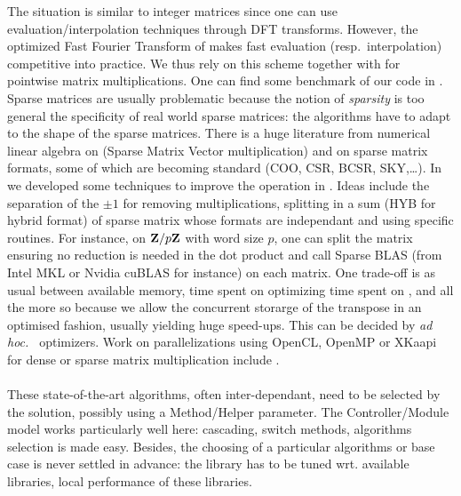%
%
The situation is similar to integer matrices since one can use
evaluation/interpolation techniques through DFT transforms. However, the
optimized Fast Fourier Transform of \cite{Harvey:2014}  makes fast evaluation
(resp.\ interpolation) competitive into practice. We thus rely on this scheme
together with \fgemm for pointwise matrix multiplications. One can find some
benchmark of our code in \cite{GioLeb14}.
%
%
Sparse matrices are usually problematic because the notion of \emph{sparsity}
is too general \vs the specificity of real world sparse matrices: the
algorithms have to adapt to the shape of the sparse matrices.
%
There is a huge literature from numerical linear algebra  on \spmv (Sparse
Matrix Vector multiplication) and on sparse matrix formats, some of which are
becoming standard (COO, CSR, BCSR, SKY,\ldots).  In \cite{Boyer:2010:spmv} we
developed some techniques to improve the \spmv operation in \linbox. Ideas
include the separation of the $\pm 1$ for removing multiplications, splitting
in a sum (HYB for hybrid format) of sparse matrix  whose formats are
independant and using specific routines. For instance, on $\mathbf{Z}{/ p\mathbf{Z}}$ with
word size $p$, one can split the matrix ensuring no reduction is needed  in the
dot product and call Sparse BLAS (from Intel \textsf{MKL} or Nvidia
\textsf{cuBLAS} for instance) on each matrix. One trade-off is as usual between
available memory, time spent on optimizing \vs time spent on \apply, and all
the more so because we allow the concurrent storarge of the transpose in an
optimised fashion, usually yielding huge speed-ups. This can be decided by
\emph{ad hoc.\ } optimizers.
%
Work on parallelizations using \textsf{OpenCL}, \textsf{OpenMP} or
\textsf{XKaapi} for dense or sparse matrix multiplication include
\cite{Boyer:2010:spmv,WST12,DGPZ14}.

\paragraph{}
These state-of-the-art algorithms, often inter-dependant, need to be selected
by the \mul solution, possibly using a Method/Helper parameter. The
Controller/Module model works particularly well here: cascading, switch
methods, algorithms selection is made easy. Besides, the choosing of a
particular algorithms or base case is never settled in advance: the library has
to be tuned wrt. available libraries, local performance of these libraries.

